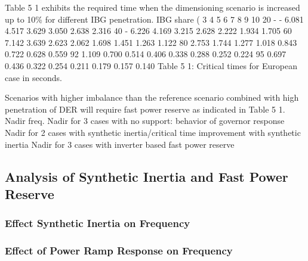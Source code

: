 Table 5 1 exhibits the required time when the dimensioning scenario is increased up to 10\% for different IBG penetration.
IBG share (%
	3	4	5	6	7	8	9	10
20	-	-	6.081	4.517	3.629	3.050	2.638	2.316
40	-	6.226	4.169	3.215	2.628	2.222	1.934	1.705
60	7.142	3.639	2.623	2.062	1.698	1.451	1.263	1.122
80	2.753	1.744	1.277	1.018	0.843	0.722	0.628	0.559
92	1.109	0.700	0.514	0.406	0.338	0.288	0.252	0.224
95	0.697	0.436	0.322	0.254	0.211	0.179	0.157	0.140
Table 5 1: Critical times for European case in seconds.



Scenarios with higher imbalance than the reference scenario combined with high penetration of DER will require fast power reserve as indicated in Table 5 1.
Nadir freq.
Nadir for 3 cases with no support: behavior of governor response
Nadir for 2 cases with synthetic inertia/critical time improvement with synthetic inertia
Nadir for 3 cases with inverter based fast power reserve


\subsection{Analysis of Synthetic Inertia and Fast Power Reserve}

\subsubsection{Effect Synthetic Inertia on Frequency}





\subsubsection{Effect of Power Ramp Response on Frequency}

